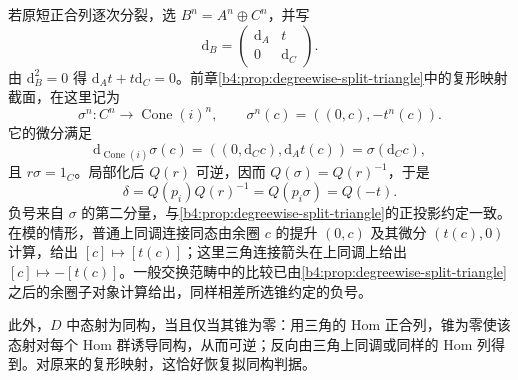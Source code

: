 若原短正合列逐次分裂，选 \(B^n=A^n\oplus C^n\)，并写
\[
	\mathrm{d}_B=\begin{pmatrix}\mathrm{d}_A&t\\0&\mathrm{d}_C\end{pmatrix}.
\]
由 \(\mathrm{d}_B^2=0\) 得 \(\mathrm{d}_At+t\mathrm{d}_C=0\)。前章\cref{b4:prop:degreewise-split-triangle}中的复形映射截面，在这里记为
\[
	\sigma^n:C^n\longrightarrow\operatorname{Cone}(i)^n, \qquad \sigma^n(c)=((0,c),-t^n(c)).
\]
它的微分满足
\[
	\mathrm{d}_{\operatorname{Cone}(i)}\sigma(c) =((0,\mathrm{d}_Cc),\mathrm{d}_At(c)) =\sigma(\mathrm{d}_Cc),
\]
且 \(r\sigma=1_C\)。局部化后 \(Q(r)\) 可逆，因而 \(Q(\sigma)=Q(r)^{-1}\)，于是
\[
	\delta=Q(p_i)Q(r)^{-1}=Q(p_i\sigma)=Q(-t).
\]
负号来自 \(\sigma\) 的第二分量，与\cref{b4:prop:degreewise-split-triangle}的正投影约定一致。在模的情形，普通上同调连接同态由余圈 \(c\) 的提升 \((0,c)\) 及其微分 \((t(c),0)\) 计算，给出 \([c]\mapsto[t(c)]\)；这里三角连接箭头在上同调上给出 \([c]\mapsto-[t(c)]\)。一般交换范畴中的比较已由\cref{b4:prop:degreewise-split-triangle}之后的余圈子对象计算给出，同样相差所选锥约定的负号。

\ProseParagraphBreak
此外，\(D\) 中态射为同构，当且仅当其锥为零：用三角的 Hom 正合列，锥为零使该态射对每个 Hom 群诱导同构，从而可逆；反向由三角上同调或同样的 Hom 列得到。对原来的复形映射，这恰好恢复拟同构判据。
